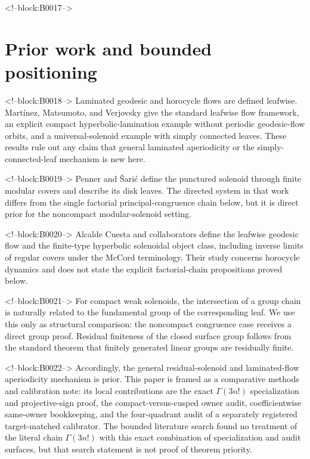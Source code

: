 \documentclass[11pt]{article}
\theoremstyle{definition}
\theoremstyle{remark}
\begin{document}
<!--block:B0017-->
\section{Prior work and bounded positioning}

<!--block:B0018-->
Laminated geodesic and horocycle flows are defined leafwise. Martínez, Matsumoto, and Verjovsky give the standard leafwise flow framework, an explicit compact hyperbolic-lamination example without periodic geodesic-flow orbits, and a universal-solenoid example with simply connected leaves.
\citep[Section~2.2 and Examples~4, 6]{martinez2016}
These results rule out any claim that general laminated aperiodicity or the simply-connected-leaf mechanism is new here.

<!--block:B0019-->
Penner and Šarić define the punctured solenoid through finite modular covers and describe its disk leaves.
\citep[Introduction and Definition~2.1]{penner2008}
The directed system in that work differs from the single factorial principal-congruence chain below, but it is direct prior for the noncompact modular-solenoid setting.

<!--block:B0020-->
Alcalde Cuesta and collaborators define the leafwise geodesic flow and the finite-type hyperbolic solenoidal object class, including inverse limits of regular covers under the McCord terminology.
\citep[Definitions~4, 5, and 7]{alcalde2026}
Their study concerns horocycle dynamics and does not state the explicit factorial-chain propositions proved below.

<!--block:B0021-->
For compact weak solenoids, the intersection of a group chain is naturally related to the fundamental group of the corresponding leaf.
\citep[Definition~5.5]{hurder2019}
We use this only as structural comparison: the noncompact congruence case receives a direct group proof. Residual finiteness of the closed surface group follows from the standard theorem that finitely generated linear groups are residually finite.
\citep[p.~1]{nica2013}

<!--block:B0022-->
Accordingly, the general residual-solenoid and laminated-flow aperiodicity mechanism is prior. This paper is framed as a comparative methods and calibration note: its local contributions are the exact $\Gamma(3n!)$ specialization and projective-sign proof, the compact-versus-cusped owner audit, coefficientwise same-owner bookkeeping, and the four-quadrant audit of a separately registered target-matched calibrator. The bounded literature search found no treatment of the literal chain $\Gamma(3n!)$ with this exact combination of specialization and audit surfaces, but that search statement is not proof of theorem priority.
\end{document}
